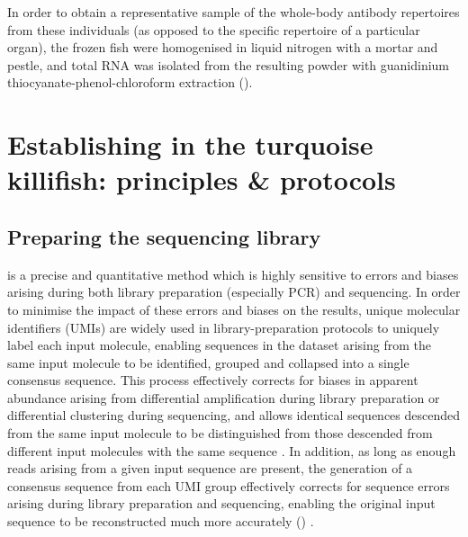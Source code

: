 In order to obtain a representative sample of the whole-body antibody repertoires from these individuals (as opposed to the specific repertoire of a particular organ), the frozen fish were homogenised in liquid nitrogen with a mortar and pestle, and total RNA was isolated from the resulting powder with guanidinium thiocyanate-phenol-chloroform extraction ().

\section{Establishing \igseq in the turquoise killifish: principles \& protocols}
\label{sec:igseq_protocol}

\subsection{Preparing the sequencing library}
\label{sec:igseq_protocol_library}

\IGSEQ is a precise and quantitative method which is highly sensitive to errors and biases arising during both library preparation (especially PCR) and sequencing. In order to minimise the impact of these errors and biases on the results, unique molecular identifiers (UMIs) are widely used in \igseq library-preparation protocols \parencite{vollmers2013consensus,turchaninova2016igprep} to uniquely label each input molecule, enabling sequences in the dataset arising from the same input molecule to be identified, grouped and collapsed into a single consensus sequence. This process effectively corrects for biases in apparent abundance arising from differential amplification during library preparation or differential clustering during sequencing, and allows identical sequences descended from the same input molecule to be distinguished from those descended from different input molecules with the same sequence \parencite{vollmers2013consensus}. In addition, as long as enough reads arising from a given input sequence are present, the generation of a consensus sequence from each UMI group effectively corrects for sequence errors arising during library preparation and sequencing, enabling the original input sequence to be reconstructed much more accurately () \parencite{vollmers2013consensus,turchaninova2016igprep}.

